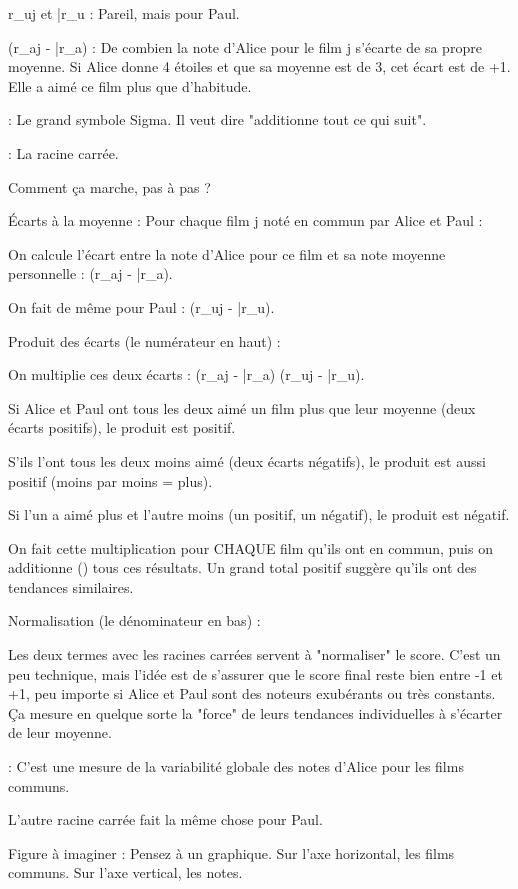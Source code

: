r_{uj} et \bar{r}_u : Pareil, mais pour Paul.

(r_{aj} - \bar{r}_a) : De combien la note d'Alice pour le film j s'écarte de sa propre moyenne. Si Alice donne 4 étoiles et que sa moyenne est de 3, cet écart est de +1. Elle a aimé ce film plus que d'habitude.

\sum : Le grand symbole Sigma. Il veut dire "additionne tout ce qui suit".

\sqrt{} : La racine carrée.

Comment ça marche, pas à pas ?

Écarts à la moyenne : Pour chaque film j noté en commun par Alice et Paul :

On calcule l'écart entre la note d'Alice pour ce film et sa note moyenne personnelle : (r_{aj} - \bar{r}_a).

On fait de même pour Paul : (r_{uj} - \bar{r}_u).

Produit des écarts (le numérateur en haut) :

On multiplie ces deux écarts : (r_{aj} - \bar{r}_a) \times (r_{uj} - \bar{r}_u).

Si Alice et Paul ont tous les deux aimé un film plus que leur moyenne (deux écarts positifs), le produit est positif.

S'ils l'ont tous les deux moins aimé (deux écarts négatifs), le produit est aussi positif (moins par moins = plus).

Si l'un a aimé plus et l'autre moins (un positif, un négatif), le produit est négatif.

On fait cette multiplication pour CHAQUE film qu'ils ont en commun, puis on additionne (\sum) tous ces résultats. Un grand total positif suggère qu'ils ont des tendances similaires.

Normalisation (le dénominateur en bas) :

Les deux termes avec les racines carrées servent à "normaliser" le score. C'est un peu technique, mais l'idée est de s'assurer que le score final reste bien entre -1 et +1, peu importe si Alice et Paul sont des noteurs exubérants ou très constants. Ça mesure en quelque sorte la "force" de leurs tendances individuelles à s'écarter de leur moyenne.

 : C'est une mesure de la variabilité globale des notes d'Alice pour les films communs.

L'autre racine carrée fait la même chose pour Paul.

Figure à imaginer :
Pensez à un graphique. Sur l'axe horizontal, les films communs. Sur l'axe vertical, les notes.

